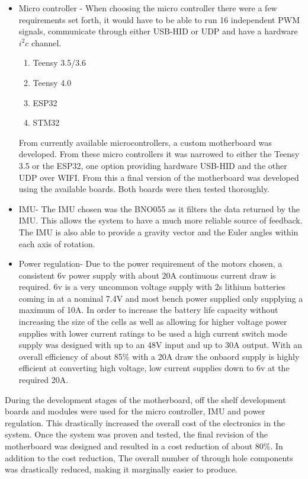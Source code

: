 \documentclass[12pt]{report}
\begin{document}
    \begin{itemize}
        \item Micro controller -
            When choosing the micro controller there were a few requirements set forth, it would have to be able to run 16 independent PWM signals, communicate through either USB-HID or UDP and have a hardware $i^2c$ channel.
            \begin{enumerate}
                \item Teensy 3.5/3.6
                \item Teensy 4.0
                \item ESP32
                \item STM32
            \end{enumerate}
            From currently available microcontrollers, a custom motherboard was developed. From these micro controllers it was narrowed to either the Teensy 3.5 or the ESP32, one option providing hardware USB-HID and the other UDP over WIFI. From this a final version of the motherboard was developed using the available boards. Both boards were then tested thoroughly.\newline
            
        \item IMU- 
            The IMU chosen was the BNO055 as it filters the data returned by the IMU. This allows the system to have a much more reliable source of feedback. The IMU is also able to provide a gravity vector and the Euler angles within each axis of rotation.\newline
            
        \item Power regulation-
        Due to the power requirement of the motors chosen, a consistent 6v power supply with about 20A continuous current draw is required. 6v is a very uncommon voltage supply with 2s lithium batteries coming in at a nominal 7.4V and most bench power supplied only supplying a maximum of 10A. In order to increase the battery life capacity without increasing the size of the cells as well as allowing for higher voltage power supplies with lower current ratings to be used a high current switch mode supply was designed with up to an 48V input and up to 30A output. With an overall efficiency of about 85\% with a 20A draw the onbaord supply is highly efficient at converting high voltage, low current supplies down to 6v at the required 20A. \newline
    \end{itemize}
    During the development stages of the motherboard, off the shelf development boards and modules were used for the micro controller, IMU and power regulation. This drastically increased the overall cost of the electronics in the system. Once the system was proven and tested, the final revision of the motherboard was designed and resulted in a cost reduction of about 80\%. In addition to the cost reduction, The overall number of through hole components was drastically reduced, making it marginally easier to produce.
\end{document}

